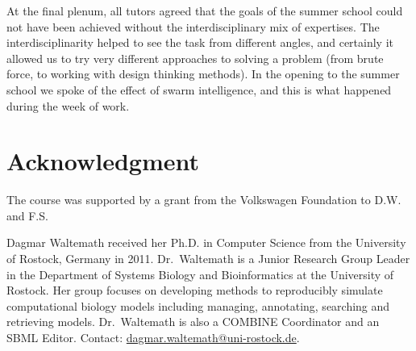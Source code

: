 \documentclass[journal,transmag]{IEEEtran}
\begin{document}
At the final plenum, all tutors agreed that the goals of the summer school could not have been achieved without the interdisciplinary mix of expertises. 
The interdisciplinarity helped to see the task from different angles, and certainly it allowed us to try very different approaches to solving a problem (from brute force, to working with design thinking methods). 
In the opening to the summer school we spoke of the effect of swarm intelligence, and this is what happened during the week of work.

\section*{Acknowledgment}
The course was supported by a grant from the Volkswagen Foundation to D.W. and F.S. 

\ifCLASSOPTIONcaptionsoff
  \newpage
\fi




% 

\begin{IEEEbiography}{Dagmar Waltemath}
received her Ph.D. in Computer Science from the University of Rostock, Germany in 2011. 
Dr.~Waltemath is a Junior Research Group Leader in the Department of Systems Biology and Bioinformatics at the University of Rostock. 
Her group focuses on developing methods to reproducibly simulate computational biology models including managing, annotating, searching and retrieving models.
Dr.~Waltemath is also a COMBINE Coordinator and an SBML Editor. 
Contact: \href{mailto:dagmar.waltemath@uni-rostock.de}{dagmar.waltemath@uni-rostock.de}.
\end{IEEEbiography}
\end{document}
